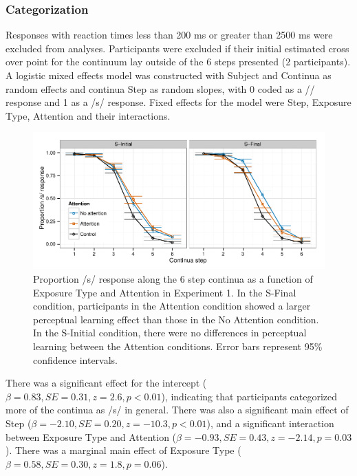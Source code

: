 \subsubsection{Categorization}

Responses with reaction times less than 200 ms or greater than 2500 ms were excluded from analyses. 
Participants were excluded if their initial estimated cross over point for the continuum lay outside of the 6 steps presented (2 participants).  
A logistic mixed effects model was constructed with Subject and Continua as random effects and continua Step as random slopes, with 0 coded as a /\textesh/ response and 1 as a /s/ response.  Fixed effects for the model were Step, Exposure Type, Attention and their interactions.

\begin{figure}[!ht]
\caption{Proportion /s/ response along the 6 step continua as a function of Exposure Type and Attention in Experiment 1.    In the S-Final condition, participants in the Attention condition showed a larger perceptual learning effect than those in the No Attention condition.  In the S-Initial condition, there were no differences in perceptual learning between the Attention conditions. Error bars represent 95\% confidence intervals.}
\label{fig:exp1categ}
\begin{center}
\includegraphics[width=\textwidth]{graphs/exp1_categresults}
\end{center}
\end{figure}

There was a significant effect for the intercept ($\beta = 0.83, SE = 0.31, z = 2.6, p < 0.01$), indicating that participants categorized more of the continua as /s/ in general.  There was also a significant main effect of Step ($\beta = -2.10, SE = 0.20, z = -10.3, p < 0.01$), and a significant interaction between Exposure Type and Attention ($\beta = -0.93, SE = 0.43, z = -2.14, p = 0.03$).  There was a marginal main effect of Exposure Type ($\beta =0.58, SE = 0.30, z = 1.8, p = 0.06$).  

